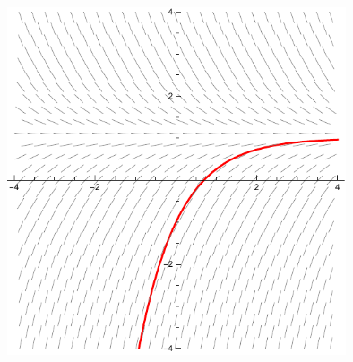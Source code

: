 \documentclass[10pt]{mypackage}
\begin{document}
\begin{example}
  \begin{center}
    \includegraphics[width=10cm]{images/abcdef.pdf}
  \end{center}
\end{example}
\end{document}
